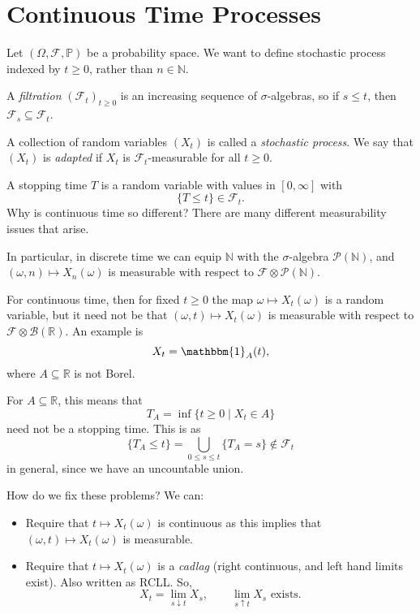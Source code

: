 \documentclass[12pt]{article}
\begin{document}
\newpage

\section{Continuous Time Processes}%
\label{sec:ctp}

Let $(\Omega, \mathcal{F}, \mathbb{P})$ be a probability space. We want to define stochastic process indexed by $t \geq 0$, rather than $n \in \mathbb{N}$.

A \emph{filtration} $(\mathcal{F}_t)_{t \geq 0}$ is an increasing sequence of $\sigma$-algebras, so if $s \leq t$, then $\mathcal{F}_s \subseteq \mathcal{F}_t$.

A collection of random variables $(X_t)$ is called a \emph{stochastic process}. We say that $(X_t)$ is \emph{adapted} if $X_t$ is $\mathcal{F}_t$-measurable for all $t \geq 0$.

A stopping time $T$ is a random variable with values in $[0, \infty]$ with
\[
	\{T \leq t\} \in \mathcal{F}_t.
\]
Why is continuous time so different? There are many different measurability issues that arise.

In particular, in discrete time we can equip $\mathbb{N}$ with the $\sigma$-algebra $\mathcal{P}(\mathbb{N})$, and $(\omega, n) \mapsto X_n(\omega)$ is measurable with respect to $\mathcal{F} \otimes \mathcal{P}(\mathbb{N})$.

For continuous time, then for fixed $t \geq 0$ the map $\omega \mapsto X_t(\omega)$ is a random variable, but it need not be that $(\omega, t) \mapsto X_t(\omega)$ is measurable with respect to $\mathcal{F} \otimes \mathcal{B}(\mathbb{R})$. An example is
\[
X_t = \mathbbm{1}_{A}(t),
\]
where $A \subseteq \mathbb{R}$ is not Borel.

For $A \subseteq \mathbb{R}$, this means that
\[
	T_A = \inf\{t \geq 0 \mid X_t \in A\}
\]
need not be a stopping time. This is as
\[
	\{T_A \leq t\} = \bigcup_{0 \leq s \leq t} \{T_A = s\} \not \in \mathcal{F}_t
\]
in general, since we have an uncountable union.

How do we fix these problems? We can:
\begin{itemize}
	\item Require that $t \mapsto X_t (\omega)$ is continuous as this implies that $(\omega, t) \mapsto X_t(\omega)$ is measurable.
	\item Require that $t \mapsto X_t(\omega)$ is a \emph{cadlag} (right continuous, and left hand limits exist). Also written as RCLL. So,
		\[
			X_t = \lim_{s \downarrow t} X_s, \qquad \lim_{s \uparrow t} X_s \text{ exists}.
		\]
\end{itemize}
\end{document}
